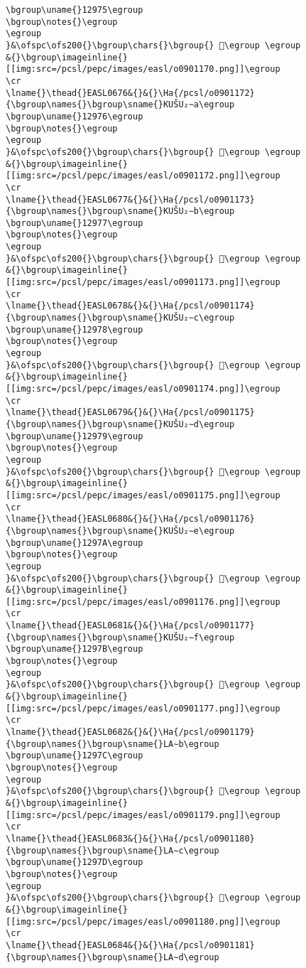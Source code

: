 \begin{verbatim}
\bgroup\uname{}12975\egroup
\bgroup\notes{}\egroup
\egroup
}&\ofspc\ofs200{}\bgroup\chars{}\bgroup{} 𒥵\egroup \egroup
&{}\bgroup\imageinline{}[[img:src=/pcsl/pepc/images/easl/o0901170.png]]\egroup
\cr
\lname{}\thead{}EASL0676&{}&{}\Ha{/pcsl/o0901172}{\bgroup\names{}\bgroup\sname{}KUŠU₂∼a\egroup
\bgroup\uname{}12976\egroup
\bgroup\notes{}\egroup
\egroup
}&\ofspc\ofs200{}\bgroup\chars{}\bgroup{} 𒥶\egroup \egroup
&{}\bgroup\imageinline{}[[img:src=/pcsl/pepc/images/easl/o0901172.png]]\egroup
\cr
\lname{}\thead{}EASL0677&{}&{}\Ha{/pcsl/o0901173}{\bgroup\names{}\bgroup\sname{}KUŠU₂∼b\egroup
\bgroup\uname{}12977\egroup
\bgroup\notes{}\egroup
\egroup
}&\ofspc\ofs200{}\bgroup\chars{}\bgroup{} 𒥷\egroup \egroup
&{}\bgroup\imageinline{}[[img:src=/pcsl/pepc/images/easl/o0901173.png]]\egroup
\cr
\lname{}\thead{}EASL0678&{}&{}\Ha{/pcsl/o0901174}{\bgroup\names{}\bgroup\sname{}KUŠU₂∼c\egroup
\bgroup\uname{}12978\egroup
\bgroup\notes{}\egroup
\egroup
}&\ofspc\ofs200{}\bgroup\chars{}\bgroup{} 𒥸\egroup \egroup
&{}\bgroup\imageinline{}[[img:src=/pcsl/pepc/images/easl/o0901174.png]]\egroup
\cr
\lname{}\thead{}EASL0679&{}&{}\Ha{/pcsl/o0901175}{\bgroup\names{}\bgroup\sname{}KUŠU₂∼d\egroup
\bgroup\uname{}12979\egroup
\bgroup\notes{}\egroup
\egroup
}&\ofspc\ofs200{}\bgroup\chars{}\bgroup{} 𒥹\egroup \egroup
&{}\bgroup\imageinline{}[[img:src=/pcsl/pepc/images/easl/o0901175.png]]\egroup
\cr
\lname{}\thead{}EASL0680&{}&{}\Ha{/pcsl/o0901176}{\bgroup\names{}\bgroup\sname{}KUŠU₂∼e\egroup
\bgroup\uname{}1297A\egroup
\bgroup\notes{}\egroup
\egroup
}&\ofspc\ofs200{}\bgroup\chars{}\bgroup{} 𒥺\egroup \egroup
&{}\bgroup\imageinline{}[[img:src=/pcsl/pepc/images/easl/o0901176.png]]\egroup
\cr
\lname{}\thead{}EASL0681&{}&{}\Ha{/pcsl/o0901177}{\bgroup\names{}\bgroup\sname{}KUŠU₂∼f\egroup
\bgroup\uname{}1297B\egroup
\bgroup\notes{}\egroup
\egroup
}&\ofspc\ofs200{}\bgroup\chars{}\bgroup{} 𒥻\egroup \egroup
&{}\bgroup\imageinline{}[[img:src=/pcsl/pepc/images/easl/o0901177.png]]\egroup
\cr
\lname{}\thead{}EASL0682&{}&{}\Ha{/pcsl/o0901179}{\bgroup\names{}\bgroup\sname{}LA∼b\egroup
\bgroup\uname{}1297C\egroup
\bgroup\notes{}\egroup
\egroup
}&\ofspc\ofs200{}\bgroup\chars{}\bgroup{} 𒥼\egroup \egroup
&{}\bgroup\imageinline{}[[img:src=/pcsl/pepc/images/easl/o0901179.png]]\egroup
\cr
\lname{}\thead{}EASL0683&{}&{}\Ha{/pcsl/o0901180}{\bgroup\names{}\bgroup\sname{}LA∼c\egroup
\bgroup\uname{}1297D\egroup
\bgroup\notes{}\egroup
\egroup
}&\ofspc\ofs200{}\bgroup\chars{}\bgroup{} 𒥽\egroup \egroup
&{}\bgroup\imageinline{}[[img:src=/pcsl/pepc/images/easl/o0901180.png]]\egroup
\cr
\lname{}\thead{}EASL0684&{}&{}\Ha{/pcsl/o0901181}{\bgroup\names{}\bgroup\sname{}LA∼d\egroup

\end{verbatim}
